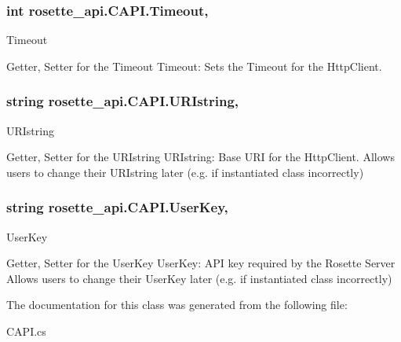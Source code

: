 \subsubsection[{Timeout}]{\setlength{\rightskip}{0pt plus 5cm}int rosette\+\_\+api.\+C\+A\+P\+I.\+Timeout\hspace{0.3cm}{\ttfamily [get]}, {\ttfamily [set]}}\label{classrosette__api_1_1_c_a_p_i_a3e204eb9849f713e523e744e2ca5a1f1}


Timeout 

Getter, Setter for the Timeout Timeout\+: Sets the Timeout for the Http\+Client. \hypertarget{classrosette__api_1_1_c_a_p_i_a3c358533f274d3cd22d789d943a57e68}{}
\subsubsection[{U\+R\+Istring}]{\setlength{\rightskip}{0pt plus 5cm}string rosette\+\_\+api.\+C\+A\+P\+I.\+U\+R\+Istring\hspace{0.3cm}{\ttfamily [get]}, {\ttfamily [set]}}\label{classrosette__api_1_1_c_a_p_i_a3c358533f274d3cd22d789d943a57e68}


U\+R\+Istring 

Getter, Setter for the U\+R\+Istring U\+R\+Istring\+: Base U\+R\+I for the Http\+Client. Allows users to change their U\+R\+Istring later (e.\+g. if instantiated class incorrectly) \hypertarget{classrosette__api_1_1_c_a_p_i_a841f1b659a19158a503657d71020acba}{}
\subsubsection[{User\+Key}]{\setlength{\rightskip}{0pt plus 5cm}string rosette\+\_\+api.\+C\+A\+P\+I.\+User\+Key\hspace{0.3cm}{\ttfamily [get]}, {\ttfamily [set]}}\label{classrosette__api_1_1_c_a_p_i_a841f1b659a19158a503657d71020acba}


User\+Key 

Getter, Setter for the User\+Key User\+Key\+: A\+P\+I key required by the Rosette Server Allows users to change their User\+Key later (e.\+g. if instantiated class incorrectly) 

The documentation for this class was generated from the following file\+:\begin{DoxyCompactItemize}
\item 
C\+A\+P\+I.\+cs\end{DoxyCompactItemize}
